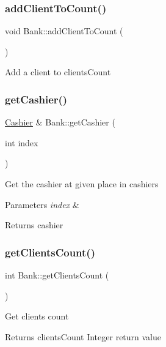 \subsubsection{\texorpdfstring{add\+Client\+To\+Count()}{addClientToCount()}}
{\footnotesize\ttfamily void Bank\+::add\+Client\+To\+Count (\begin{DoxyParamCaption}{ }\end{DoxyParamCaption})}

Add a client to clients\+Count \mbox{\label{classBank_a7eb0b71ef408a8e9798eb1d28e1733ea}} 
\subsubsection{\texorpdfstring{get\+Cashier()}{getCashier()}}
{\footnotesize\ttfamily \hyperlink{classCashier}{Cashier} \& Bank\+::get\+Cashier (\begin{DoxyParamCaption}\item[{int}]{index }\end{DoxyParamCaption})}

Get the cashier at given place in cashiers 
\begin{DoxyParams}{Parameters}
{\em index} & \\
\hline
\end{DoxyParams}
\begin{DoxyReturn}{Returns}
cashier 
\end{DoxyReturn}
\mbox{\label{classBank_a46e579a690e0d3ca175923fcbae30a2d}} 
\subsubsection{\texorpdfstring{get\+Clients\+Count()}{getClientsCount()}}
{\footnotesize\ttfamily int Bank\+::get\+Clients\+Count (\begin{DoxyParamCaption}{ }\end{DoxyParamCaption})}

Get clients count \begin{DoxyReturn}{Returns}
clients\+Count Integer return value 
\end{DoxyReturn}
\mbox{\label{classBank_a406e1fc9b050ed4559760c5a52fe81e4}} 
